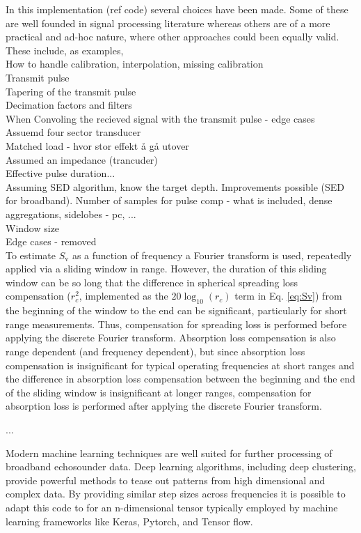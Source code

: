 \documentclass[preprint,12pt,TurnOnLineNumbers]{JASAnew}
\newcommand{\sv}{S_{\textrm{v}}}
\newcommand{\range}{r}
\begin{document}
In this implementation (ref code) several choices have been made. Some of these are well founded in signal processing literature whereas others are of a more practical and ad-hoc nature, where other approaches could been equally valid. These include, as examples,\\ 
How to handle calibration, interpolation, missing calibration\\
Transmit pulse\\
Tapering of the transmit pulse\\
Decimation factors and filters\\
When Convoling the recieved signal with the transmit pulse - edge cases\\
Assuemd four sector transducer\\
Matched load - hvor stor effekt å gå utover \\
Assumed an impedance (trancuder)\\
Effective pulse duration...\\
Assuming SED algorithm, know the target depth. Improvements possible (SED for broadband). Number of samples for pulse comp - what is included, dense aggregations, sidelobes - pc, ...\\
Window size\\
Edge cases - removed\\

To estimate $\sv$ as a function of frequency a Fourier transform is used, repeatedly applied via a sliding window in range. However, the duration of this sliding window can be so long that the difference in spherical spreading loss compensation ($r_c^2$, implemented as the $20\log_{10}(\range_c)$ term in Eq. \ref{eq:Sv}) from the beginning of the window to the end can be significant, particularly for short range measurements. Thus, compensation for spreading loss is performed before applying the discrete Fourier transform. Absorption loss compensation is also range dependent (and frequency dependent), but since absorption loss compensation is insignificant for typical operating frequencies at short ranges and the difference in absorption loss compensation between the beginning and the end of the sliding window is insignificant at longer ranges, compensation for absorption loss is performed after applying the discrete Fourier transform.

...

Modern machine learning techniques are well suited for further processing of broadband echosounder data. Deep learning algorithms, including deep clustering, provide powerful methods to tease out patterns from high dimensional and complex data. By providing similar step sizes across frequencies it is possible to adapt this code to for an n-dimensional tensor typically employed by machine learning frameworks like Keras, Pytorch, and Tensor flow. 
\end{document}
